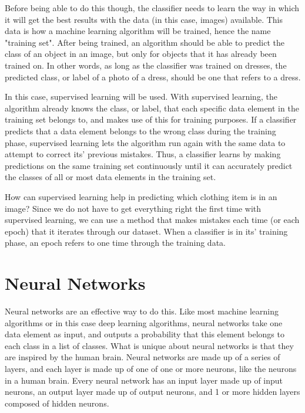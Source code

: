 \documentclass[12pt]{report} %
\begin{document}
	Before being able to do this though, the classifier needs to learn the way in which it will get the best results with the data (in this case, images) available. This data is how a machine learning algorithm will be trained, hence the name "training set". After being trained, an algorithm should be able to predict the class of an object in an image, but only for objects that it has already been trained on. In other words, as long as the classifier was trained on dresses, the predicted class, or label of a photo of a dress, should be one that refers to a dress. 
	
	In this case, supervised learning will be used. With supervised learning, the algorithm already knows the class, or label, that each specific data element in the training set belongs to, and makes use of this for training purposes. If a classifier predicts that a data element belongs to the wrong class during the training phase, supervised learning lets the algorithm run again with the same data to attempt to correct its' previous mistakes\cite{aurelienMachineLearning}. Thus, a classifier learns by making predictions on the same training set continuously until it can accurately predict the classes of all or most data elements in the training set. 
	
	How can supervised learning help in predicting which clothing item is in an image? Since we do not have to get everything right the first time with supervised learning, we can use a method that makes mistakes each time (or each epoch) that it iterates through our dataset. When a classifier is in its' training phase, an epoch refers to one time through the training data.
	
\section{Neural Networks}
	Neural networks are an effective way to do this. Like most machine learning algorithms or in this case deep learning algorithms, neural networks take one data element as input, and outputs a probability that this element belongs to each class in a list of classes. What is unique about neural networks is that they are inspired by the human brain. Neural networks are made up of a series of layers, and each layer is made up of one of one or more neurons, like the neurons in a human brain. Every neural network has an input layer made up of input neurons, an output layer made up of output neurons, and 1 or more hidden layers composed of hidden neurons.
\end{document}
